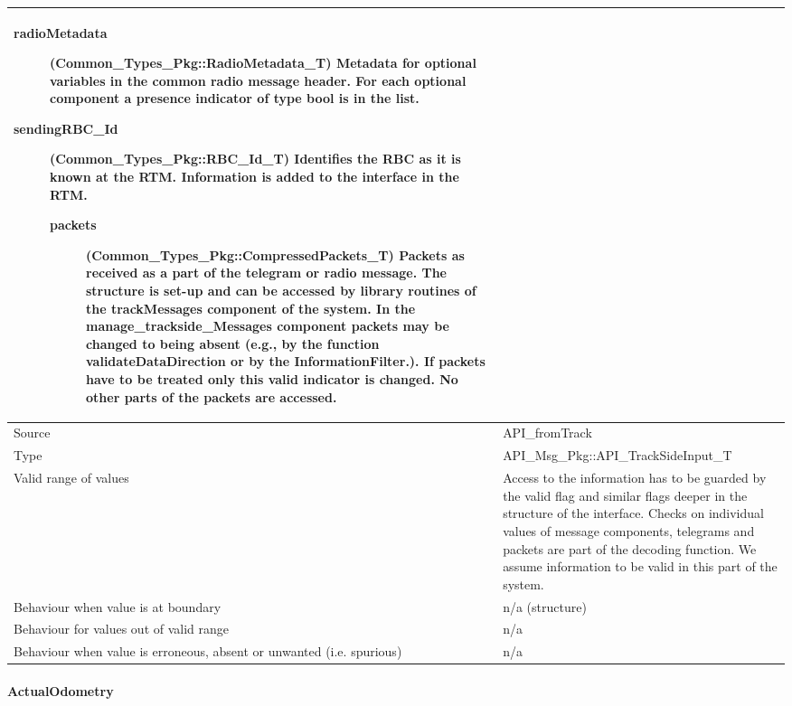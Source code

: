 \begin{longtable}{p{}p{}}
\begin{description}
\begin{description}
\item[radioMetadata](Common\_Types\_Pkg::RadioMetadata\_T) Metadata for optional variables in the common radio message header. For each optional component a presence indicator of type bool is in the list.  
\item[sendingRBC\_Id](Common\_Types\_Pkg::RBC\_Id\_T) Identifies the RBC as it is known at the RTM. Information is added to the interface in the RTM.
\begin{description}
\item[packets](Common\_Types\_Pkg::CompressedPackets\_T) Packets as received as a part of the telegram or radio message. The structure is set-up and can be accessed by library routines of the trackMessages component of the system. In the manage\_trackside\_Messages component packets may be changed to being absent (e.g., by the function validateDataDirection or by the InformationFilter.). If packets have to be treated only this valid indicator is changed. No other parts of the packets are accessed.
\end{description}
\end{description}
\end{description}
\\
\midrule
Source					& API\_fromTrack 
\\ 
\midrule
Type					& API\_Msg\_Pkg::API\_TrackSideInput\_T \\
\midrule
Valid range of values	& Access to the information has to be guarded by the valid flag and similar flags deeper in the structure of the interface. Checks on individual values of message components, telegrams and packets are part of the decoding function. We assume information to be valid in this part of the system.\\
\midrule
Behaviour when value is at boundary	& n/a (structure)\\
\midrule
Behaviour for values out of valid range	& n/a\\
\midrule
Behaviour when value is erroneous, absent or unwanted (i.e. spurious) &n/a\\
\bottomrule
\end{longtable}


\paragraph{ActualOdometry}

